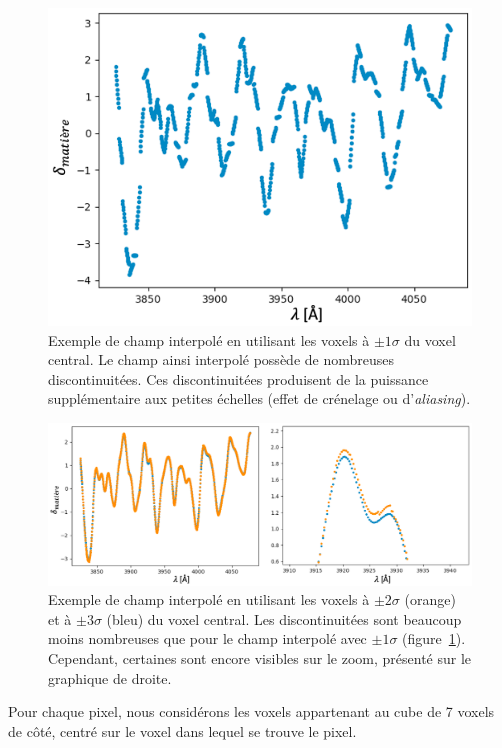 \documentclass[11pt, twoside, a4paper, openright]{report}
\begin{document}
\begin{figure}
  \centering
  \includegraphics[scale=0.5]{smoothing11}
  \caption{Exemple de champ interpolé en utilisant les voxels à $\pm 1 \sigma$ du voxel central. Le champ ainsi interpolé possède de nombreuses discontinuitées. Ces discontinuitées produisent de la puissance supplémentaire aux petites échelles (effet de crénelage ou d'\emph{aliasing}).}
  \label{fig:smoothing11}
\end{figure}
\begin{figure}
  \centering
  \includegraphics[scale=0.4]{smoothing23}
  \caption{Exemple de champ interpolé en utilisant les voxels à $\pm 2 \sigma$ (orange) et à $\pm 3 \sigma$ (bleu) du voxel central. Les discontinuitées sont beaucoup moins nombreuses que pour le champ interpolé avec $\pm 1 \sigma$ (figure~\ref{fig:smoothing11}). Cependant, certaines sont encore visibles sur le zoom, présenté sur le graphique de droite.}
  \label{fig:smoothing23}
\end{figure}
Pour chaque pixel, nous considérons les voxels appartenant au cube de 7 voxels de côté, centré sur le voxel dans lequel se trouve le pixel. %
\end{document}
